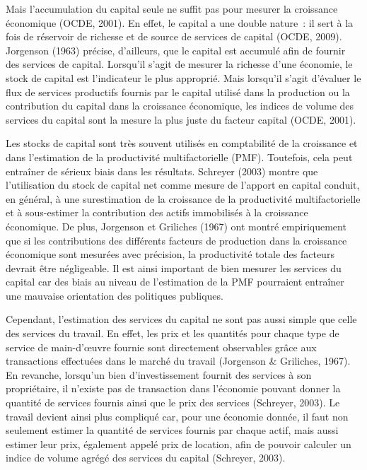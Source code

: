 \documentclass[12pt,a4paper,oneside]{report}
\begin{document}
Mais l’accumulation du capital seule ne suffit pas pour mesurer la croissance économique (OCDE, 2001). En
effet, le capital a une double nature~: il sert à la fois de réservoir de richesse et de source de services de
capital (OCDE, 2009). Jorgenson (1963) précise, d’ailleurs, que le capital est accumulé afin de fournir des
services de capital. Lorsqu’il s’agit de mesurer la richesse d’une économie, le stock de capital est
l’indicateur le plus approprié. Mais lorsqu’il s’agit d’évaluer le flux de services productifs fournis par le
capital utilisé dans la production ou la contribution du capital dans la croissance économique, les indices de volume des services du capital sont la mesure la plus juste du facteur capital (OCDE, 2001).

Les stocks de capital sont très souvent utilisés en comptabilité de la croissance et dans l’estimation de la
productivité multifactorielle (PMF). Toutefois, cela peut entraîner de sérieux biais dans les résultats.
Schreyer (2003) montre que l’utilisation du stock de capital net comme mesure de l’apport en capital conduit,
en général, à une surestimation de la croissance de la productivité multifactorielle et à sous-estimer la
contribution des actifs immobilisés à la croissance économique. De plus, Jorgenson et Griliches (1967) ont
montré empiriquement que si les contributions des différents facteurs de production dans la croissance
économique sont mesurées avec précision, la productivité totale des facteurs devrait être négligeable. Il est
ainsi important de bien mesurer les services du capital car des biais au niveau de l’estimation de la PMF
pourraient entraîner une mauvaise orientation des politiques publiques.

Cependant, l’estimation des services du capital ne sont pas aussi simple que celle des services du travail. En
effet, les prix et les quantités pour chaque type de service de main-d’œuvre fournie sont directement
observables grâce aux transactions effectuées dans le marché du travail (Jorgenson \& Griliches, 1967). En
revanche, lorsqu’un bien d’investissement fournit des services à son propriétaire, il n’existe pas de
transaction dans l’économie pouvant donner la quantité de services fournis ainsi que le prix des services
(Schreyer, 2003). Le travail devient ainsi plus compliqué car, pour une économie donnée, il faut non seulement
estimer la quantité de services fournis par chaque actif, mais aussi estimer leur prix, également appelé prix
de location, afin de pouvoir calculer un indice de volume agrégé des services du capital (Schreyer, 2003).
\end{document}
